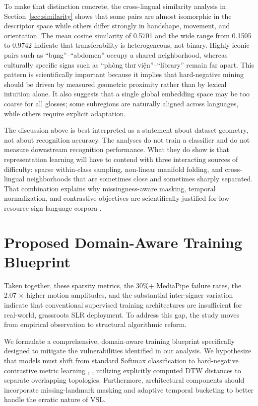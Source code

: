 \documentclass{ieeeaccess}
\begin{document}
To make that distinction concrete, the cross-lingual similarity analysis in Section~\ref{sec:similarity} shows that some pairs are almost isomorphic in the descriptor space while others differ strongly in handshape, movement, and orientation. The mean cosine similarity of 0.5701 and the wide range from 0.1505 to 0.9742 indicate that transferability is heterogeneous, not binary. Highly iconic pairs such as ``bụng''--``abdomen'' occupy a shared neighborhood, whereas culturally specific signs such as ``phòng thư viện''--``library'' remain far apart. This pattern is scientifically important because it implies that hard-negative mining should be driven by measured geometric proximity rather than by lexical intuition alone. It also suggests that a single global embedding space may be too coarse for all glosses; some subregions are naturally aligned across languages, while others require explicit adaptation.

The discussion above is best interpreted as a statement about dataset geometry, not about recognition accuracy. The analyses do not train a classifier and do not measure downstream recognition performance. What they do show is that representation learning will have to contend with three interacting sources of difficulty: sparse within-class sampling, non-linear manifold folding, and cross-lingual neighborhoods that are sometimes close and sometimes sharply separated. That combination explains why missingness-aware masking, temporal normalization, and contrastive objectives are scientifically justified for low-resource sign-language corpora \cite{buda2018systematic, chen2020simple, robinson2020contrastive, sakoe1978dynamic}.

\section{Proposed Domain-Aware Training Blueprint} \label{sec:actionplan}

Taken together, these sparsity metrics, the 30\%+ MediaPipe failure rates, the 2.07 $\times$ higher motion amplitudes, and the substantial inter-signer variation indicate that conventional supervised training architectures are insufficient for real-world, grassroots SLR deployment. To address this gap, the study moves from empirical observation to structural algorithmic reform. 

We formulate a comprehensive, domain-aware training blueprint specifically designed to mitigate the vulnerabilities identified in our analysis. We hypothesize that models must shift from standard Softmax classification to hard-negative contrastive metric learning \cite{chen2020simple}, \cite{robinson2020contrastive}, utilizing explicitly computed DTW distances to separate overlapping topologies. Furthermore, architectural components should incorporate missing-landmark masking and adaptive temporal bucketing to better handle the erratic nature of VSL.
\end{document}
